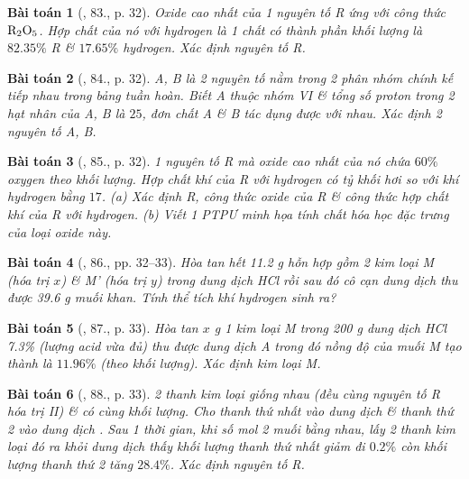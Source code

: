 \documentclass{article}
\newtheorem{baitoan}{Bài toán}
\begin{document}
\begin{baitoan}[\cite{An_400_BT_Hoa_Hoc_9}, 83., p. 32]
	Oxide cao nhất của 1 nguyên tố R ứng với công thức $\rm R_2O_5$. Hợp chất của nó với hydrogen là 1 chất có thành phần khối lượng là $82.35\%$ R \& $17.65\%$ hydrogen. Xác định nguyên tố R.
\end{baitoan}

\begin{baitoan}[\cite{An_400_BT_Hoa_Hoc_9}, 84., p. 32]
	A, B là 2 nguyên tố nằm trong 2 phân nhóm chính kế tiếp nhau trong bảng tuần hoàn. Biết A thuộc nhóm VI \& tổng số proton trong 2 hạt nhân của A, B là $25$, đơn chất A \& B tác dụng được với nhau. Xác định 2 nguyên tố A, B.
\end{baitoan}

\begin{baitoan}[\cite{An_400_BT_Hoa_Hoc_9}, 85., p. 32]
	1 nguyên tố R mà oxide cao nhất của nó chứa $60\%$ oxygen theo khối lượng. Hợp chất khí của R với hydrogen có tỷ khối hơi so với khí hydrogen bằng $17$. (a) Xác định R, công thức oxide của R \& công thức hợp chất khí của R với hydrogen. (b) Viết 1 {\rm PTPƯ} minh họa tính chất hóa học đặc trưng của loại oxide này.
\end{baitoan}

\begin{baitoan}[\cite{An_400_BT_Hoa_Hoc_9}, 86., pp. 32--33]
	Hòa tan hết {\rm11.2 g} hỗn hợp gồm 2 kim loại M (hóa trị $x$) \& M' (hóa trị $y$) trong dung dịch {\rm HCl} rồi sau đó cô cạn dung dịch thu được {\rm39.6 g} muối khan. Tính thể tích khí hydrogen sinh ra?
\end{baitoan}

\begin{baitoan}[\cite{An_400_BT_Hoa_Hoc_9}, 87., p. 33]
	Hòa tan $x$ {\rm g} 1 kim loại M trong {\rm200 g} dung dịch {\rm HCl 7.3\%} (lượng acid vừa đủ) thu được dung dịch A trong đó nồng độ của muối M tạo thành là $11.96\%$ (theo khối lượng). Xác định kim loại M.
\end{baitoan}

\begin{baitoan}[\cite{An_400_BT_Hoa_Hoc_9}, 88., p. 33]
	2 thanh kim loại giống nhau (đều cùng nguyên tố R hóa trị II) \& có cùng khối lượng. Cho thanh thứ nhất vào dung dịch {\rm{}} \& thanh thứ 2 vào dung dịch {\rm{}}. Sau 1 thời gian, khi số mol 2 muối bằng nhau, lấy 2 thanh kim loại đó ra khỏi dung dịch thấy khối lượng thanh thứ nhất giảm đi $0.2\%$ còn khối lượng thanh thứ 2 tăng $28.4\%$. Xác định nguyên tố R.
\end{baitoan}
\end{document}
